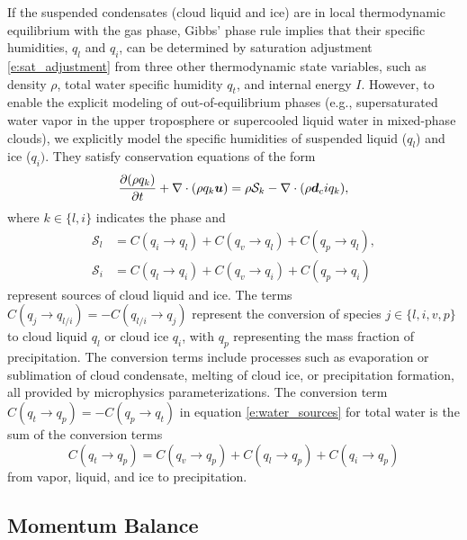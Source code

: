 \documentclass{report}
\begin{document}
If the suspended condensates (cloud liquid and ice) are in local thermodynamic equilibrium with the gas phase, Gibbs' phase rule implies that their specific humidities, $q_l$ and $q_i$, can be determined by saturation adjustment \eqref{e:sat_adjustment} from three other thermodynamic state variables, such as density $\rho$, total water specific humidity $q_t$, and internal energy $I$. However, to enable the explicit modeling of out-of-equilibrium phases (e.g., supersaturated water vapor in the upper troposphere or supercooled liquid water in mixed-phase clouds), we explicitly model the specific humidities of suspended liquid ($q_l$) and ice ($q_i)$. They satisfy conservation equations of the form
\begin{equation}
\frac{\partial (\rho q_k)}{\partial t} + \nabla \cdot (\rho q_k \boldsymbol{{u}}) = \rho \mathcal{S}_k  -\nabla \cdot (\rho \boldsymbol{{d}}_ci
{q
_k}),   
\label{eq:governing_equations/condensate}
\end{equation}
where $k \in \{l, i\}$ indicates the phase and 
\begin{align}
    \mathcal{S}_l & = C(q_i \rightarrow q_l) + C(q_v \rightarrow q_l) + C(q_p \rightarrow q_l), \\
    \mathcal{S}_i & = C(q_l \rightarrow q_i) + C(q_v \rightarrow q_i) + C(q_p \rightarrow q_i)
\end{align}
represent sources of cloud liquid and ice. The terms $C(q_j \rightarrow q_{l/i}) = - C(q_{l/i} \rightarrow q_j)$ represent the conversion of species $j \in \{l, i, v, p\}$ to cloud liquid $q_l$ or cloud ice $q_i$, with $q_p$ representing the mass fraction of precipitation. The conversion terms include processes such as evaporation or sublimation of cloud condensate, melting of cloud ice, or precipitation formation, all provided by microphysics parameterizations. The conversion term $C(q_t \rightarrow q_p) = -C(q_p \rightarrow q_t)$ in equation \eqref{e:water_sources} for total water is the sum of the conversion terms
\begin{equation}
    C(q_t \rightarrow q_p) = C(q_v \rightarrow q_p) + C(q_l \rightarrow q_p) + C(q_i \rightarrow q_p)
\end{equation}
from vapor, liquid, and ice to precipitation. 

\subsection{Momentum Balance}
\end{document}
